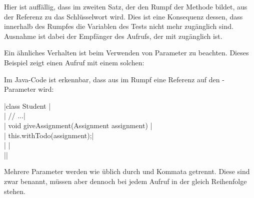 Hier ist auffällig, dass im zweiten Satz, der den Rumpf der Methode bildet,
aus der Referenz zu  das Schlüsselwort  wird.
Dies ist eine Konsequenz dessen, dass innerhalb des Rumpfes die Variablen des Tests nicht mehr zugänglich sind.
Ausnahme ist dabei der Empfänger des Aufrufs, der mit  zugänglich ist.

Ein ähnliches Verhalten ist beim Verwenden von Parameter zu beachten.
Dieses Beispiel zeigt einen Aufruf mit einem solchen:


Im Java-Code ist erkennbar, dass aus  im Rumpf eine Referenz auf den -Parameter wird:


\jcode|class Student {|\\
\jcode|    // ...|\\
\jcode|    void giveAssignment(Assignment assignment) {|\\
\jcode|        this.withTodo(assignment);|\\
\jcode|    }|\\
\jcode|}|

Mehrere Parameter werden wie üblich durch  und Kommata getrennt.
Diese sind zwar benannt, müssen aber dennoch bei jedem Aufruf in der gleich Reihenfolge stehen.


